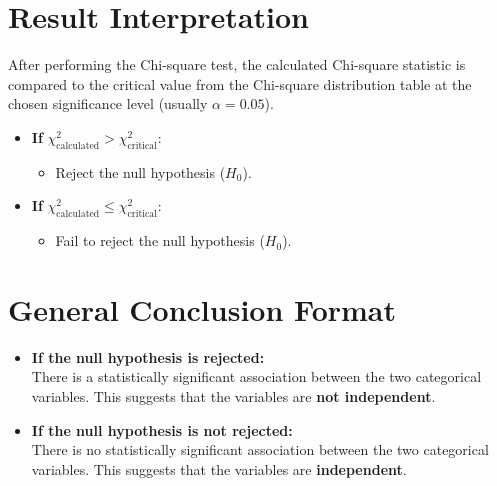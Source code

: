 \documentclass[12pt]{article}
\begin{document}
\section{Result Interpretation}

After performing the Chi-square test, the calculated Chi-square statistic is compared to the critical value from the Chi-square distribution table at the chosen significance level (usually $\alpha = 0.05$).

\begin{itemize}
    \item \textbf{If} $\chi^2_{\text{calculated}} > \chi^2_{\text{critical}}$:
    \begin{itemize}
        \item Reject the null hypothesis ($H_0$).
    \end{itemize}
    
    \item \textbf{If} $\chi^2_{\text{calculated}} \leq \chi^2_{\text{critical}}$:
    \begin{itemize}
        \item Fail to reject the null hypothesis ($H_0$).
    \end{itemize}
\end{itemize}

\section{General Conclusion Format}

\begin{itemize}
    \item \textbf{If the null hypothesis is rejected:} \\
    There is a statistically significant association between the two categorical variables. This suggests that the variables are \textbf{not independent}.

    \item \textbf{If the null hypothesis is not rejected:} \\
    There is no statistically significant association between the two categorical variables. This suggests that the variables are \textbf{independent}.
\end{itemize}
\end{document}
